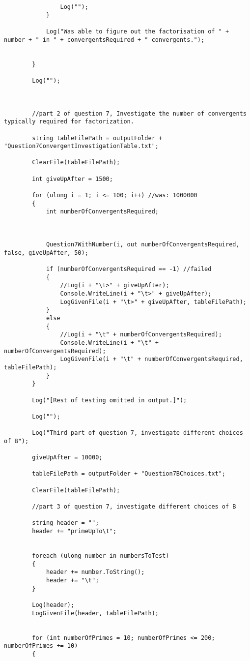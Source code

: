 \documentclass{article}
\begin{document}
\begin{lstlisting}
				Log("");
			}
			
			Log("Was able to figure out the factorisation of " + number + " in " + convergentsRequired + " convergents.");
			
			
		}
		
		Log("");
		
		
		
		//part 2 of question 7, Investigate the number of convergents typically required for factorization.
		
		string tableFilePath = outputFolder + "Question7ConvergentInvestigationTable.txt";
		
		ClearFile(tableFilePath);
		
		int giveUpAfter = 1500;
		
		for (ulong i = 1; i <= 100; i++) //was: 1000000
		{
			int numberOfConvergentsRequired;
			
			
			
			Question7WithNumber(i, out numberOfConvergentsRequired, false, giveUpAfter, 50);
			
			if (numberOfConvergentsRequired == -1) //failed
			{
				//Log(i + "\t>" + giveUpAfter);
				Console.WriteLine(i + "\t>" + giveUpAfter);
				LogGivenFile(i + "\t>" + giveUpAfter, tableFilePath);
			}
			else
			{
				//Log(i + "\t" + numberOfConvergentsRequired);
				Console.WriteLine(i + "\t" + numberOfConvergentsRequired);
				LogGivenFile(i + "\t" + numberOfConvergentsRequired, tableFilePath);
			}
		}
		
		Log("[Rest of testing omitted in output.]");
		
		Log("");
		
		Log("Third part of question 7, investigate different choices of B");
		
		giveUpAfter = 10000;
		
		tableFilePath = outputFolder + "Question7BChoices.txt";
		
		ClearFile(tableFilePath);
		
		//part 3 of question 7, investigate different choices of B
		
		string header = "";
		header += "primeUpTo\t";
		
		
		foreach (ulong number in numbersToTest)
		{
			header += number.ToString();
			header += "\t";
		}
		
		Log(header);
		LogGivenFile(header, tableFilePath);
		
		
		for (int numberOfPrimes = 10; numberOfPrimes <= 200; numberOfPrimes += 10)
		{
			

\end{lstlisting}
\end{document}

